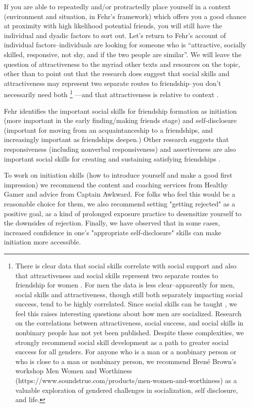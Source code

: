 \documentclass[12pt,letterpaper]{book}
\begin{document}
If you are able to repeatedly and/or protractedly place yourself in a context (environment and situation, in Fehr's framework) which offers you a good chance at proximity with high likelihood potential friends, you will still have the individual and dyadic factors to sort out. Let's return to Fehr's account of individual factors–individuals are looking for someone who is “attractive, socially skilled, responsive, not shy, and if the two people are similar”. We will leave the question of attractiveness to the myriad other texts and resources on the topic, other than to point out that the research does suggest that social skills and attractiveness may represent two separate routes to friendship–you don't necessarily need both \footnote{There is clear data that social skills correlate with social support \cite{sarason1985concomitants} and also that attractiveness and social skills represent two separate routes to friendship for women \cite{reis1982physical}. For men the data is less clear–apparently for men, social skills and attractiveness, though still both separately impacting social success, tend to be highly correlated. Since social skills can be taught \cite{brigman1999teaching,sazak2013outcomes}, we feel this raises interesting questions about how men are socialized. Research on the correlations between attractiveness, social success, and social skills in nonbinary people has not yet been published. Despite these complexities, we strongly recommend social skill development as a path to greater social success for all genders. For anyone who is a man or a nonbinary person or who is close to a man or nonbinary person, we recommend Bren{\'e} Brown's workshop Men Women and Worthiness (https://www.soundstrue.com/products/men-women-and-worthiness) as a valuable exploration of gendered challenges in socialization, self disclosure, and life.} —and that attractiveness is relative to context \cite{geiselman1984context,melamed1975effect,little2011facial,moss1975effects,lei2020contrast}.
 
Fehr identifies the important social skills for friendship formation as initiation (more important in the early finding/making friends stage) and self-disclosure (important for moving from an acquaintanceship to a friendships, and increasingly important as friendships deepen.) Other research suggests that responsiveness (including nonverbal responsiveness) and assertiveness are also important social skills for creating and sustaining satisfying friendships \cite{riggio1986assessment}.

To work on initiation skills (how to introduce yourself and make a good first impression) we recommend the content and coaching services from Healthy Gamer and advice from Captain Awkward. For folks who feel this would be a reasonable choice for them, we also recommend setting "getting rejected" as a positive goal, as a kind of prolonged exposure practice to desensitize yourself to the downsides of rejection. Finally, we have observed that in some cases, increased confidence in one's "appropriate self-disclosure" skills can make initiation more accessible.
\end{document}
